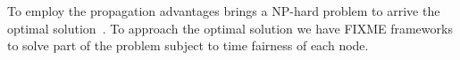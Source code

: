 



To employ the propagation advantages brings a NP-hard problem to arrive the optimal solution~\cite{arkoulis2013optimal}. 
To approach the optimal solution we have FIXME frameworks to solve part of the problem subject to time fairness of each node.




